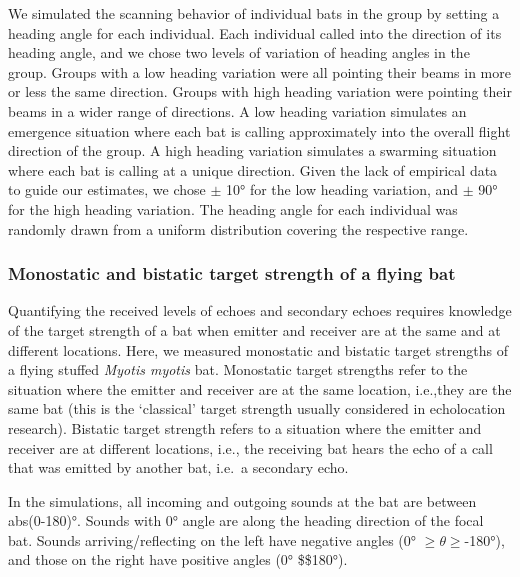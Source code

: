 \documentclass[
]{book}
\begin{document}
We simulated the scanning behavior of individual bats in the group by setting a
heading angle for each individual. Each individual called into the direction of its heading angle, and we chose two levels of variation of heading angles in the group. Groups with a low heading variation were all pointing their beams in more or less the same direction. Groups with high heading variation were pointing their beams in a wider range of directions. A low heading variation simulates an emergence situation where each bat is calling approximately into the overall flight direction of the group. A high heading variation simulates a swarming situation where each bat is calling at a unique direction. Given the lack of empirical data to guide our estimates, we chose \(\pm\) 10° for the low heading variation, and \(\pm\) 90° for the high heading variation. The heading angle for each individual was randomly drawn from a uniform distribution covering the respective range.

\hypertarget{monostatic-and-bistatic-target-strength-of-a-flying-bat}{%
\subsubsection{\texorpdfstring{Monostatic and bistatic target strength of a flying bat \label{cpn_targetstrength}}{Monostatic and bistatic target strength of a flying bat }}\label{monostatic-and-bistatic-target-strength-of-a-flying-bat}}

Quantifying the received levels of echoes and secondary echoes requires
knowledge of the target strength of a bat when emitter and receiver are at the same and at different locations. Here, we measured monostatic and bistatic target strengths \citep{richards2010a} of a flying stuffed \emph{Myotis myotis} bat. Monostatic target strengths refer to the situation where the emitter and receiver are at the same location, i.e.,they are the same bat (this is the `classical' target strength usually considered in echolocation research). Bistatic target strength refers to a situation where the emitter and receiver are at different locations, i.e., the receiving bat hears the echo of a call that was emitted by another bat, i.e.~a secondary echo.

In the simulations, all incoming and outgoing sounds at the bat are between abs(0-180)°. Sounds with 0° angle are along the heading direction of the focal bat. Sounds arriving/reflecting on the left have negative angles (0° \(\geq \theta \geq\)-180°), and those on the right have positive angles (0° \$\leq \theta \leq\$180°).
\end{document}
